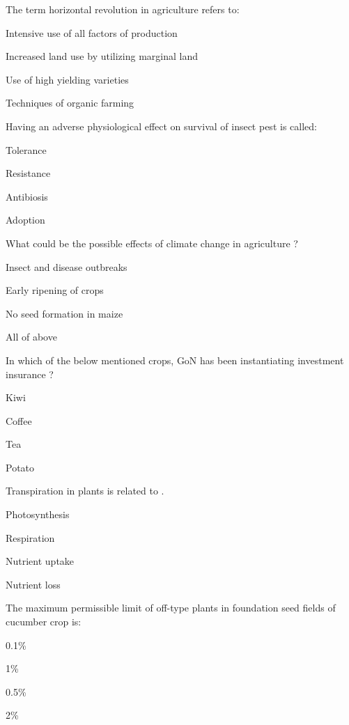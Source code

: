 \begin{questions}
\question The term horizontal revolution in agriculture refers to:
  \begin{items}
  \item Intensive use of all factors of production
  \item Increased land use by utilizing marginal land
  \item Use of high yielding varieties
  \item Techniques of organic farming
  \end{items}

\question Having an adverse physiological effect on survival of insect pest is called:
  \begin{items}
  \item Tolerance
  \item Resistance
  \item Antibiosis
  \item Adoption
  \end{items}

\question What could be the possible effects of climate change in agriculture ?
  \begin{items}
  \item Insect and disease outbreaks
  \item Early ripening of crops
  \item No seed formation in maize
  \item All of above
  \end{items}

\question In which of the below mentioned crops, GoN has been instantiating investment insurance ?
  \begin{items}
  \item Kiwi
  \item Coffee
  \item Tea
  \item Potato
  \end{items}

\question Transpiration in plants is related to \fillin[][3cm].
  \begin{items}
  \item Photosynthesis
  \item Respiration
  \item Nutrient uptake
  \item Nutrient loss
  \end{items}

\question The maximum permissible limit of off-type plants in foundation seed fields of cucumber crop is:
  \begin{items}
  \item 0.1\%
  \item 1\%
  \item 0.5\%
  \item 2\%
  \end{items}


\end{questions}
